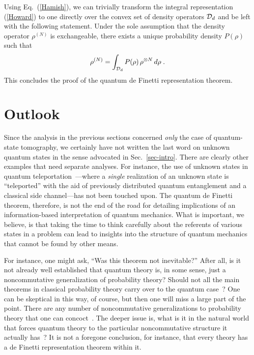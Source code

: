 \documentclass[12pt,aps,eqsecnum]{revtex4-1}
\begin{document}
Using Eq.~(\ref{Hamish}), we can trivially transform the integral
representation (\ref{Howard}) to one directly over the convex set
of density operators ${\cal D}_d$ and be left with the following
statement. Under the sole assumption that the density operator
$\rho^{(N)}$ is exchangeable, there exists a unique probability
density $P(\rho)$ such that
\begin{equation}
\rho^{(N)}=\int_{{\cal D}_d} P(\rho)\, \rho^{\otimes N}\, d\rho\;.
\end{equation}
This concludes the proof of the quantum de Finetti representation
theorem.

\section{Outlook} \label{sec-outlook}

Since the analysis in the previous sections concerned {\it only\/}
the case of quantum-state tomography, we certainly have not
written the last word on unknown quantum states in the sense
advocated in Sec.~\ref{sec-intro}. There are clearly other
examples that need separate analyses. For instance, the use of
unknown states in quantum teleportation~\cite{Bennett1993}---where
a {\it single\/} realization of an unknown state is ``teleported''
with the aid of previously distributed quantum entanglement and a
classical side channel---has not been touched upon. The quantum de
Finetti theorem, therefore, is not the end of the road for
detailing implications of an information-based interpretation of
quantum mechanics. What is important, we believe, is that taking
the time to think carefully about the referents of various states
in a problem can lead to insights into the structure of quantum
mechanics that cannot be found by other means.

For instance, one might ask, ``Was this theorem not inevitable?''
After all, is it not already well established that quantum theory
is, in some sense, just a noncommutative generalization of
probability theory?  Should not all the main theorems in classical
probability theory carry over to the quantum
case~\cite{CommentAccardi}?  One can be skeptical in this way, of
course, but then one will miss a large part of the point.  There
are any number of noncommutative generalizations to probability
theory that one can concoct~\cite{Hiai2000}.  The deeper issue is,
what is it in the natural world that forces quantum theory to the
particular noncommutative structure it actually
has~\cite{Wheeler2000}? It is not a foregone conclusion, for
instance, that every theory has a de Finetti representation
theorem within it.
\end{document}
